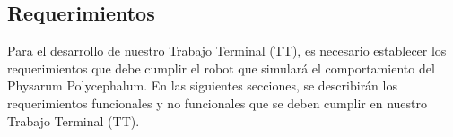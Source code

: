 \subsection{Requerimientos} %

    Para el desarrollo de nuestro Trabajo Terminal (TT), es necesario establecer los requerimientos 
        que debe cumplir el robot que simular\'a el comportamiento del Physarum Polycephalum. 
        En las siguientes secciones, se describir\'an los requerimientos funcionales y no funcionales que 
        se deben cumplir en nuestro Trabajo Terminal (TT).
    \vskip 0.5cm
    
    